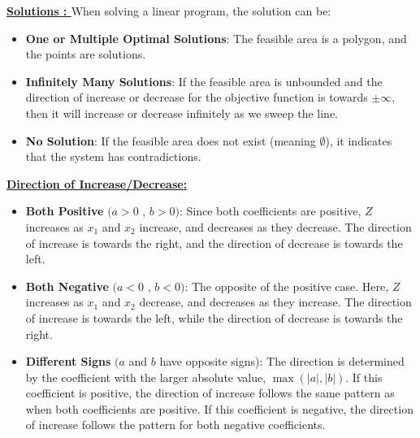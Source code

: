 \begin{tcolorbox}[title=Note]
 \textbf{\underline{Solutions : }}
When solving a linear program, the solution can be:
\begin{itemize}
    \item \textbf{One or Multiple Optimal Solutions}: The feasible area is a polygon, and the points are solutions.
    \item \textbf{Infinitely Many Solutions}: If the feasible area is unbounded and the direction of increase or decrease 
for the objective function is towards \(\pm \infty\), then it will increase or decrease infinitely as we sweep the line.
    \item \textbf{No Solution}: If the feasible area does not exist (meaning \(\emptyset\)), it indicates that the
system has contradictions.
\end{itemize}


\textbf{\underline{Direction of Increase/Decrease:}}

\begin{itemize}
    \item \textbf{Both Positive} \((a > 0\) , \(b > 0)\): Since both coefficients are positive, \( Z \) increases as
\( x_1 \) and \( x_2 \) increase, and decreases as they decrease. The direction of increase is towards the right,
and the direction of decrease is towards the left.

    \item \textbf{Both Negative} \((a < 0\) , \(b < 0)\): The opposite of the positive case. Here, \( Z \) increases
as \( x_1 \) and \( x_2 \) decrease, and decreases as they increase. The direction of increase is towards the left,
while the direction of decrease is towards the right.

    \item \textbf{Different Signs} \((a\) and \(b\) have opposite signs): The direction is determined by 
the coefficient with the larger absolute value, \(\max(|a|, |b|)\). If this coefficient is positive, the direction 
of increase follows the same pattern as when both coefficients are positive. If this coefficient is negative, 
the direction of increase follows the pattern for both negative coefficients.
\end{itemize}
\end{tcolorbox}

